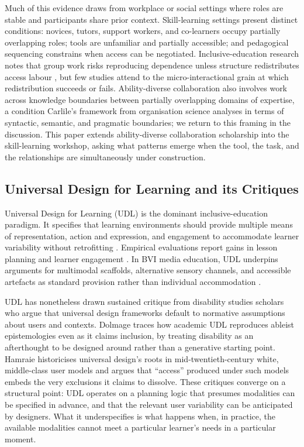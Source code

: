 Much of this evidence draws from workplace or social settings where roles are stable and participants share prior context. Skill-learning settings present distinct conditions: novices, tutors, support workers, and co-learners occupy partially overlapping roles; tools are unfamiliar and partially accessible; and pedagogical sequencing constrains when access can be negotiated. Inclusive-education research notes that group work risks reproducing dependence unless structure redistributes access labour \cite{ahmad_najmee_classroom_2025,barbieri_through_2025}, but few studies attend to the micro-interactional grain at which redistribution succeeds or fails. Ability-diverse collaboration also involves work across knowledge boundaries between partially overlapping domains of expertise, a condition Carlile's \cite{carlile_transferring_2004} framework from organisation science analyses in terms of syntactic, semantic, and pragmatic boundaries; we return to this framing in the discussion. This paper extends ability-diverse collaboration scholarship into the skill-learning workshop, asking what patterns emerge when the tool, the task, and the relationships are simultaneously under construction.

\subsection{Universal Design for Learning and its Critiques}

Universal Design for Learning (UDL) is the dominant inclusive-education paradigm. It specifies that learning environments should provide multiple means of representation, action and expression, and engagement to accommodate learner variability without retrofitting \cite{rose_universal_2001,inc_udl_2024}. Empirical evaluations report gains in lesson planning and learner engagement \cite{courey_improved_2013,rao_using_2016}. In BVI media education, UDL underpins arguments for multimodal scaffolds, alternative sensory channels, and accessible artefacts as standard provision rather than individual accommodation \cite{shaheen_exploring_2024,wilkens_using_2025,richard_jackson_audio-supported_2021}.

UDL has nonetheless drawn sustained critique from disability studies scholars who argue that universal design frameworks default to normative assumptions about users and contexts. Dolmage \cite{dolmage_academic_2017} traces how academic UDL reproduces ableist epistemologies even as it claims inclusion, by treating disability as an afterthought to be designed around rather than a generative starting point. Hamraie \cite{hamraie_building_2017} historicises universal design's roots in mid-twentieth-century white, middle-class user models and argues that ``access'' produced under such models embeds the very exclusions it claims to dissolve. These critiques converge on a structural point: UDL operates on a planning logic that presumes modalities can be specified in advance, and that the relevant user variability can be anticipated by designers. What it underspecifies is what happens when, in practice, the available modalities cannot meet a particular learner's needs in a particular moment.


